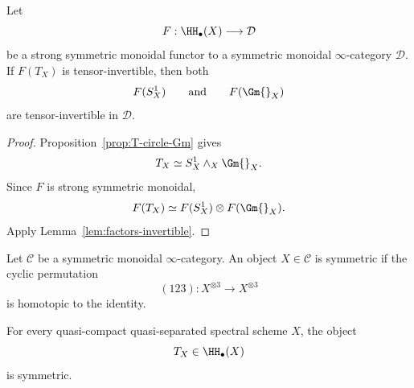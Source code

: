 \begin{corollary}
\label{cor:T-inversion-circle}
Let
\[
    F:
    \HH_\bullet(X)
    \longrightarrow
    \mathcal D
\]
be a strong symmetric monoidal functor to a symmetric monoidal
\(\infty\)-category \(\mathcal D\).  If \(F(T_X)\) is tensor-invertible,
then both
\[
    F(S^1_X)
    \qquad\text{and}\qquad
    F(\Gm{}_X)
\]
are tensor-invertible in \(\mathcal D\).
\end{corollary}

\begin{proof}
Proposition~\ref{prop:T-circle-Gm} gives
\[
    T_X
    \simeq
    S^1_X\wedge_X\Gm{}_X.
\]
Since \(F\) is strong symmetric monoidal,
\[
    F(T_X)
    \simeq
    F(S^1_X)\otimes F(\Gm{}_X).
\]
Apply Lemma~\ref{lem:factors-invertible}.
\end{proof}

\begin{definition}
\label{def:symmetric-tensor-object}
Let $\mathcal C$ be a symmetric monoidal $\infty$-category.  An object $X\in\mathcal C$ is
symmetric if the cyclic permutation
\[
    (123):X^{\otimes3}\longrightarrow X^{\otimes3}
\]
is homotopic to the identity.
\end{definition}

\begin{proposition}
\label{prop:T-symmetric}
For every quasi-compact quasi-separated spectral scheme \(X\), the object
\[
    T_X\in\HH_\bullet(X)
\]
is symmetric.
\end{proposition}

